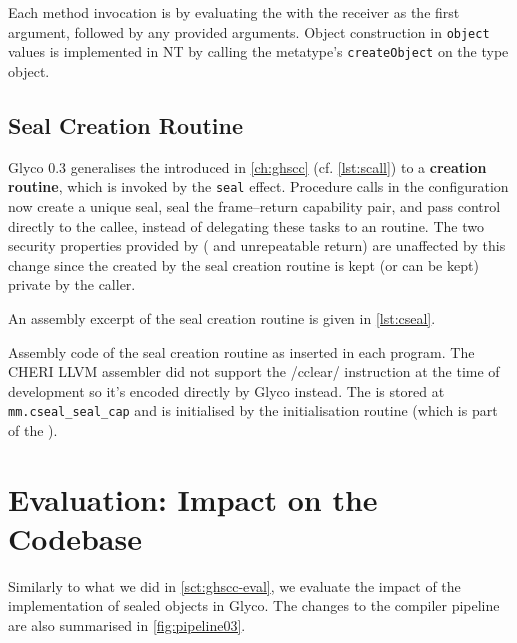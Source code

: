 \documentclass[main.tex]{subfiles}
\begin{document}
Each method invocation is \lowered{} by evaluating the  with the receiver as the first argument, followed by any provided arguments. Object construction in \texttt{object} values is implemented in NT by calling the metatype's \texttt{createObject}  on the type object.

\subsection{Seal Creation Routine}
Glyco 0.3 generalises the   introduced in \cref{ch:ghscc} (cf. \cref{lst:scall}) to a \textbf{ creation routine}, which is invoked by the \texttt{seal} effect. Procedure calls in the  configuration now create a unique seal, seal the frame–return capability pair, and pass control directly to the callee, instead of delegating these tasks to an  routine. The two security properties provided by  ( and unrepeatable return) are unaffected by this change since the  created by the seal creation routine is kept (or can be kept) private by the caller.

An assembly excerpt of the seal creation routine is given in \cref{lst:cseal}.
\begin{listing}[ht]
	\caption{Assembly code of the seal creation routine as inserted in each program. The CHERI LLVM assembler did not support the \iasm/cclear/ instruction at the time of development so it's encoded directly by Glyco instead. The  is stored at \texttt{mm.cseal_seal_cap} and is initialised by the initialisation routine (which is part of the ).}
	\label{lst:cseal}
\end{listing}

\section{Evaluation: Impact on the Codebase} \label{sct:obj-eval}
Similarly to what we did in \cref{sct:ghscc-eval}, we evaluate the impact of the implementation of sealed objects in Glyco. The changes to the compiler pipeline are also summarised in \cref{fig:pipeline03}.
\end{document}
